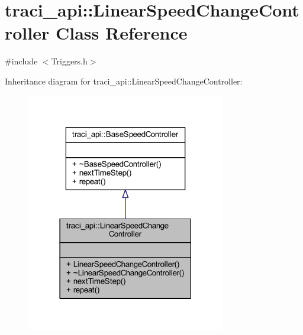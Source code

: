 \hypertarget{classtraci__api_1_1_linear_speed_change_controller}{}\section{traci\+\_\+api\+:\+:Linear\+Speed\+Change\+Controller Class Reference}
\label{classtraci__api_1_1_linear_speed_change_controller}


{\ttfamily \#include $<$Triggers.\+h$>$}



Inheritance diagram for traci\+\_\+api\+:\+:Linear\+Speed\+Change\+Controller\+:
\nopagebreak
\begin{figure}[H]
\begin{center}
\leavevmode
\includegraphics[width=246pt]{classtraci__api_1_1_linear_speed_change_controller__inherit__graph}
\end{center}
\end{figure}


